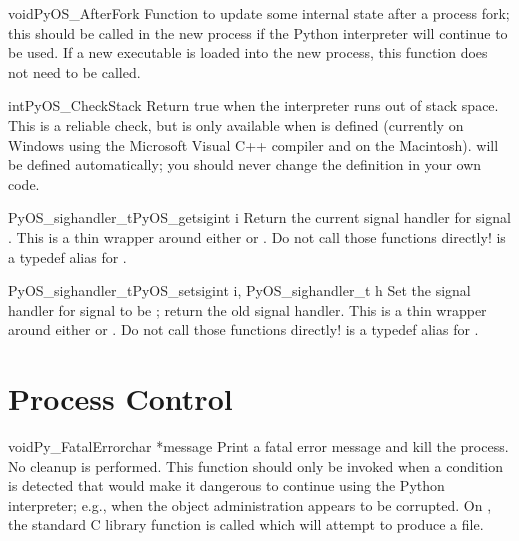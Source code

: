 \documentclass{manual}
\begin{document}
\begin{cfuncdesc}{void}{PyOS_AfterFork}{}
Function to update some internal state after a process fork; this
should be called in the new process if the Python interpreter will
continue to be used.  If a new executable is loaded into the new
process, this function does not need to be called.
\end{cfuncdesc}

\begin{cfuncdesc}{int}{PyOS_CheckStack}{}
Return true when the interpreter runs out of stack space.  This is a
reliable check, but is only available when  is
defined (currently on Windows using the Microsoft Visual C++ compiler
and on the Macintosh).   will be defined
automatically; you should never change the definition in your own
code.
\end{cfuncdesc}

\begin{cfuncdesc}{PyOS_sighandler_t}{PyOS_getsig}{int i}
Return the current signal handler for signal .
This is a thin wrapper around either  or
.  Do not call those functions directly!
 is a typedef alias for .
\end{cfuncdesc}

\begin{cfuncdesc}{PyOS_sighandler_t}{PyOS_setsig}{int i, PyOS_sighandler_t h}
Set the signal handler for signal  to be ;
return the old signal handler.
This is a thin wrapper around either  or
.  Do not call those functions directly!
 is a typedef alias for .
\end{cfuncdesc}


\section{Process Control \label{processControl}}

\begin{cfuncdesc}{void}{Py_FatalError}{char *message}
Print a fatal error message and kill the process.  No cleanup is
performed.  This function should only be invoked when a condition is
detected that would make it dangerous to continue using the Python
interpreter; e.g., when the object administration appears to be
corrupted.  On \UNIX{}, the standard C library function
 is called which will attempt to
produce a  file.
\end{cfuncdesc}
\end{document}
